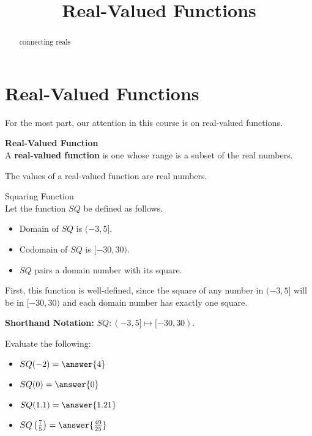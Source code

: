 \documentclass{ximera}
\title{Real-Valued Functions}
\begin{document}
\begin{abstract}
connecting reals
\end{abstract}
\maketitle




\section{Real-Valued Functions}

For the most part, our attention in this course is on real-valued functions.




\begin{definition} \textbf{\textcolor{green!50!black}{Real-Valued Function}} \\

A \textbf{real-valued function} is one whose range is a subset of the real numbers.

\end{definition}
The values of a real-valued function are real numbers.







\begin{example} Squaring Function \\

Let the function $SQ$ be defined as follows.


\begin{itemize}
\item Domain of $SQ$ is $(-3, 5]$.
\item Codomain of $SQ$ is $[-30, 30)$.
\item $SQ$ pairs a domain number with its square.
\end{itemize}


First, this function is well-defined, since the square of any number in $(-3, 5]$ will be in $[-30, 30)$ and each domain number has exactly one square.


\textbf{Shorthand Notation: } $SQ: (-3, 5] \mapsto [-30, 30)$.

\begin{question}
Evaluate the following:

\begin{itemize}
	\item $SQ(-2) = \answer{4}$
	\item $SQ(0) = \answer{0}$
	\item $SQ(1.1) = \answer{1.21}$
	\item $SQ\left(\frac{7}{5}\right) = \answer{\frac{49}{25}}$
\end{itemize}

\end{question}

\end{example}
\end{document}
